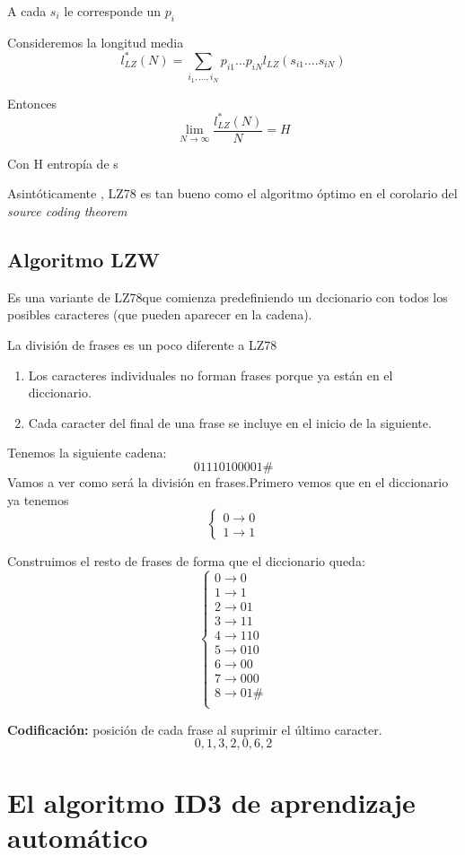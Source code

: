 A cada $s_i$ le corresponde un $p_i$
\begin{theorem}
	Consideremos la longitud media
	$$l^{*}_{LZ}(N) = \sum_{i_1,...,i_N} p_{i1}...p_{iN} l_{LZ}(s_{i1}....s_{iN})$$

	Entonces
	$$\lim_{N\rightarrow \infty} \frac{l^{*}_{LZ}(N)}{N} = H$$

	Con H entropía de s
\end{theorem}

\obs Asintóticamente , LZ78 es tan bueno como el algoritmo óptimo en el corolario del \textit{source coding theorem}

\subsection{Algoritmo LZW}

Es una variante de LZ78que comienza predefiniendo un dccionario con todos los posibles caracteres (que pueden aparecer en la cadena).

La división de frases es un poco diferente a LZ78
\begin{enumerate}
	\item Los caracteres individuales no forman frases porque ya están en el diccionario.
	\item Cada caracter del final de una frase se incluye en el inicio de la siguiente.
\end{enumerate}

\begin{example}
	Tenemos la siguiente cadena:
	$$01110100001\#$$
	Vamos a ver como será la división en frases.Primero vemos que en el diccionario ya tenemos
	$$\begin{cases}
	0 \rightarrow 0\\
	1 \rightarrow 1
	\end{cases}$$

	Construimos el resto de frases de forma que el diccionario queda:
		$$\begin{cases}
		0 \rightarrow 0\\
		1 \rightarrow 1\\
		2 \rightarrow 01\\
		3 \rightarrow 11\\
		4 \rightarrow 110\\
		5 \rightarrow 010\\
		6 \rightarrow 00\\
		7 \rightarrow 000\\
		8 \rightarrow 01\#\\
		\end{cases}$$

	\textbf{Codificación:} posición de cada frase al suprimir el último caracter.
	$$0,1,3,2,0,6,2$$
\end{example}

\section{El algoritmo ID3 de aprendizaje automático}

